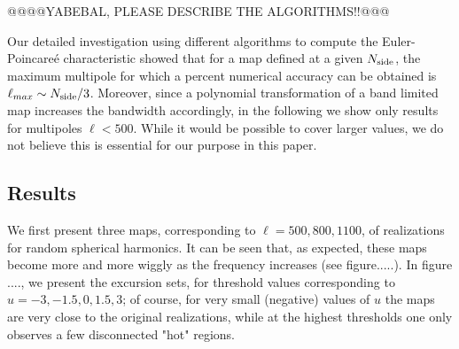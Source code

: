\documentclass[aps,prd,showpacs,superscriptaddress,groupedaddress]{revtex4-1}  %
\begin{document}
@@@@YABEBAL, PLEASE DESCRIBE THE ALGORITHMS!!@@@




Our detailed investigation using different algorithms to compute the
Euler-Poincare\'{e} characteristic showed that for a map defined at a
given $N_{\rm side}$, the maximum multipole for which a percent
numerical accuracy can be obtained is $\ell_{max} \sim N_{\rm
  side}/3$. Moreover, since a polynomial transformation of a band
limited map increases the bandwidth accordingly, in the following we
show only results for multipoles $\ell<500$. While it would be
possible to cover larger values, we do not believe this is
essential for our purpose in this paper.




\subsection*{Results}

We first present three maps, corresponding to $\ell=500,800,1100$, of realizations for random spherical harmonics. It can be seen that, as expected, these maps become more and more wiggly as the frequency increases (see figure.....). In figure ...., we present the excursion sets, for threshold values corresponding to $u=-3,-1.5,0,1.5,3$; of course, for very small (negative) values of $u$ the maps are very close to the original realizations, while at the highest thresholds one only observes a few disconnected "hot" regions.
\end{document}
